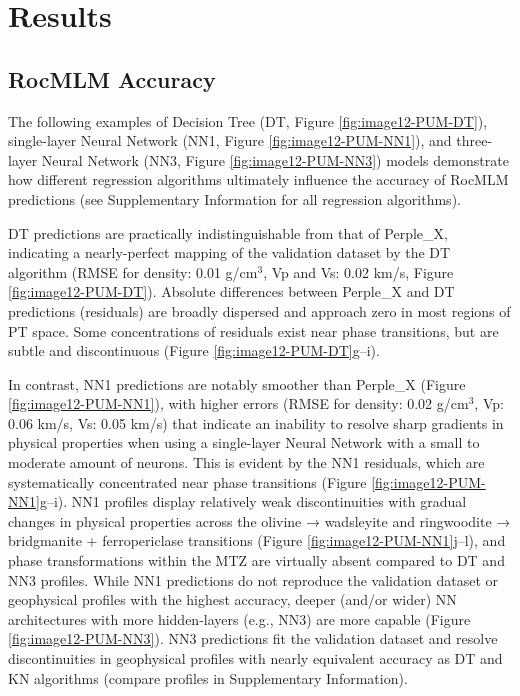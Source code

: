 \documentclass[draft,linenumbers]{agujournal2018}
\begin{document}
\section{Results}\label{sec:results}

\subsection{RocMLM Accuracy}\label{sec:rocmlms-accuracy}

The following examples of Decision Tree (DT, Figure \ref{fig:image12-PUM-DT}), single-layer Neural Network (NN1, Figure \ref{fig:image12-PUM-NN1}), and three-layer Neural Network (NN3, Figure \ref{fig:image12-PUM-NN3}) models demonstrate how different regression algorithms ultimately influence the accuracy of RocMLM predictions (see Supplementary Information for all regression algorithms).

DT predictions are practically indistinguishable from that of Perple\_X, indicating a nearly-perfect mapping of the validation dataset by the DT algorithm (RMSE for density: 0.01 g/cm\(^3\), Vp and Vs: 0.02 km/s, Figure \ref{fig:image12-PUM-DT}). Absolute differences between Perple\_X and DT predictions (residuals) are broadly dispersed and approach zero in most regions of PT space. Some concentrations of residuals exist near phase transitions, but are subtle and discontinuous (Figure \ref{fig:image12-PUM-DT}g--i).

In contrast, NN1 predictions are notably smoother than Perple\_X (Figure \ref{fig:image12-PUM-NN1}), with higher errors (RMSE for density: 0.02 g/cm\(^3\), Vp: 0.06 km/s, Vs: 0.05 km/s) that indicate an inability to resolve sharp gradients in physical properties when using a single-layer Neural Network with a small to moderate amount of neurons. This is evident by the NN1 residuals, which are systematically concentrated near phase transitions (Figure \ref{fig:image12-PUM-NN1}g--i). NN1 profiles display relatively weak discontinuities with gradual changes in physical properties across the olivine → wadsleyite and ringwoodite → bridgmanite + ferropericlase transitions (Figure \ref{fig:image12-PUM-NN1}j--l), and phase transformations within the MTZ are virtually absent compared to DT and NN3 profiles. While NN1 predictions do not reproduce the validation dataset or geophysical profiles with the highest accuracy, deeper (and/or wider) NN architectures with more hidden-layers (e.g., NN3) are more capable (Figure \ref{fig:image12-PUM-NN3}). NN3 predictions fit the validation dataset and resolve discontinuities in geophysical profiles with nearly equivalent accuracy as DT and KN algorithms (compare profiles in Supplementary Information).
\end{document}
